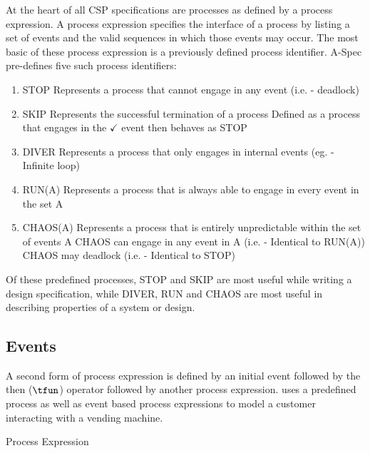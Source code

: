\documentclass[letterpaper,10pt,draft]{book}
\begin{document}
At the heart of all CSP specifications are processes as defined by a process expression.
A process expression specifies the interface of a process by listing a set of events
and the valid sequences in which those events may occur.  The most basic of these
process expression is a previously defined process identifier.  A-Spec pre-defines
five such process identifiers:
\begin{enumerate}
   \item STOP
      \subitem Represents a process that cannot engage in any event (i.e. - deadlock)
   \item SKIP
      \subitem Represents the successful termination of a process
      \subitem Defined as a process that engages in the $\checkmark$ event then behaves as STOP
   \item DIVER
      \subitem Represents a process that only engages in internal events (eg. - Infinite loop)
   \item RUN(A)
      \subitem Represents a process that is always able to engage in every event in the set A
   \item CHAOS(A)
      \subitem Represents a process that is entirely unpredictable within the set of events A
      \subitem CHAOS can engage in any event in A (i.e. - Identical to RUN(A))
      \subitem CHAOS may deadlock (i.e. - Identical to STOP)
\end{enumerate}

Of these predefined processes, STOP and SKIP are most useful while writing a design
specification, while DIVER, RUN and CHAOS are most useful in describing properties
of a system or design.

\subsection{Events}
   \label{sect:ProcEvent}

A second form of process expression is defined by an initial event followed by the
then ($\mathrel{\pthen}$) operator followed by another process expression.  
uses a predefined process as well as event based process expressions to model a
customer interacting with a vending machine.

\begin{example}
\begin{minipage}[t]{0.49\linewidth}
   
\end{minipage}
\begin{minipage}[t]{0.49\linewidth}
   \azbox
   
\end{minipage}

   \caption{Process Expression}
   \label{ex:ProcExpr}
\end{example}
\end{document}
